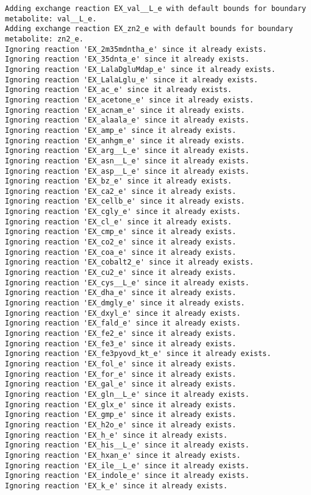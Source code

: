 \documentclass[
  letterpaper,
  DIV=11,
  numbers=noendperiod]{scrartcl}
\begin{document}
\begin{verbatim}
Adding exchange reaction EX_val__L_e with default bounds for boundary metabolite: val__L_e.
Adding exchange reaction EX_zn2_e with default bounds for boundary metabolite: zn2_e.
Ignoring reaction 'EX_2m35mdntha_e' since it already exists.
Ignoring reaction 'EX_35dnta_e' since it already exists.
Ignoring reaction 'EX_LalaDgluMdap_e' since it already exists.
Ignoring reaction 'EX_LalaLglu_e' since it already exists.
Ignoring reaction 'EX_ac_e' since it already exists.
Ignoring reaction 'EX_acetone_e' since it already exists.
Ignoring reaction 'EX_acnam_e' since it already exists.
Ignoring reaction 'EX_alaala_e' since it already exists.
Ignoring reaction 'EX_amp_e' since it already exists.
Ignoring reaction 'EX_anhgm_e' since it already exists.
Ignoring reaction 'EX_arg__L_e' since it already exists.
Ignoring reaction 'EX_asn__L_e' since it already exists.
Ignoring reaction 'EX_asp__L_e' since it already exists.
Ignoring reaction 'EX_bz_e' since it already exists.
Ignoring reaction 'EX_ca2_e' since it already exists.
Ignoring reaction 'EX_cellb_e' since it already exists.
Ignoring reaction 'EX_cgly_e' since it already exists.
Ignoring reaction 'EX_cl_e' since it already exists.
Ignoring reaction 'EX_cmp_e' since it already exists.
Ignoring reaction 'EX_co2_e' since it already exists.
Ignoring reaction 'EX_coa_e' since it already exists.
Ignoring reaction 'EX_cobalt2_e' since it already exists.
Ignoring reaction 'EX_cu2_e' since it already exists.
Ignoring reaction 'EX_cys__L_e' since it already exists.
Ignoring reaction 'EX_dha_e' since it already exists.
Ignoring reaction 'EX_dmgly_e' since it already exists.
Ignoring reaction 'EX_dxyl_e' since it already exists.
Ignoring reaction 'EX_fald_e' since it already exists.
Ignoring reaction 'EX_fe2_e' since it already exists.
Ignoring reaction 'EX_fe3_e' since it already exists.
Ignoring reaction 'EX_fe3pyovd_kt_e' since it already exists.
Ignoring reaction 'EX_fol_e' since it already exists.
Ignoring reaction 'EX_for_e' since it already exists.
Ignoring reaction 'EX_gal_e' since it already exists.
Ignoring reaction 'EX_gln__L_e' since it already exists.
Ignoring reaction 'EX_glx_e' since it already exists.
Ignoring reaction 'EX_gmp_e' since it already exists.
Ignoring reaction 'EX_h2o_e' since it already exists.
Ignoring reaction 'EX_h_e' since it already exists.
Ignoring reaction 'EX_his__L_e' since it already exists.
Ignoring reaction 'EX_hxan_e' since it already exists.
Ignoring reaction 'EX_ile__L_e' since it already exists.
Ignoring reaction 'EX_indole_e' since it already exists.
Ignoring reaction 'EX_k_e' since it already exists.

\end{verbatim}
\end{document}
